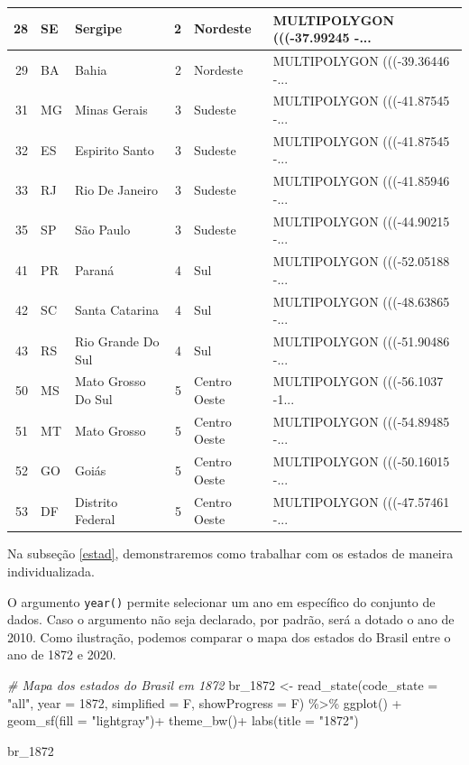 \documentclass[
  brazilian,
]{book}
\newenvironment{Shaded}{\begin{snugshade}}{\end{snugshade}}
\newcommand{\AttributeTok}[1]{\textcolor[rgb]{0.77,0.63,0.00}{#1}}
\newcommand{\CommentTok}[1]{\textcolor[rgb]{0.56,0.35,0.01}{\textit{#1}}}
\newcommand{\DecValTok}[1]{\textcolor[rgb]{0.00,0.00,0.81}{#1}}
\newcommand{\FunctionTok}[1]{\textcolor[rgb]{0.00,0.00,0.00}{#1}}
\newcommand{\NormalTok}[1]{#1}
\newcommand{\OtherTok}[1]{\textcolor[rgb]{0.56,0.35,0.01}{#1}}
\newcommand{\SpecialCharTok}[1]{\textcolor[rgb]{0.00,0.00,0.00}{#1}}
\newcommand{\StringTok}[1]{\textcolor[rgb]{0.31,0.60,0.02}{#1}}
\begin{document}
\begin{table}
\begin{tabular}[t]{r|l|l|r|l|l}
\hline
28 & SE & Sergipe & 2 & Nordeste & MULTIPOLYGON (((-37.99245 -...\\
\hline
29 & BA & Bahia & 2 & Nordeste & MULTIPOLYGON (((-39.36446 -...\\
\hline
31 & MG & Minas Gerais & 3 & Sudeste & MULTIPOLYGON (((-41.87545 -...\\
\hline
32 & ES & Espirito Santo & 3 & Sudeste & MULTIPOLYGON (((-41.87545 -...\\
\hline
33 & RJ & Rio De Janeiro & 3 & Sudeste & MULTIPOLYGON (((-41.85946 -...\\
\hline
35 & SP & São Paulo & 3 & Sudeste & MULTIPOLYGON (((-44.90215 -...\\
\hline
41 & PR & Paraná & 4 & Sul & MULTIPOLYGON (((-52.05188 -...\\
\hline
42 & SC & Santa Catarina & 4 & Sul & MULTIPOLYGON (((-48.63865 -...\\
\hline
43 & RS & Rio Grande Do Sul & 4 & Sul & MULTIPOLYGON (((-51.90486 -...\\
\hline
50 & MS & Mato Grosso Do Sul & 5 & Centro Oeste & MULTIPOLYGON (((-56.1037 -1...\\
\hline
51 & MT & Mato Grosso & 5 & Centro Oeste & MULTIPOLYGON (((-54.89485 -...\\
\hline
52 & GO & Goiás & 5 & Centro Oeste & MULTIPOLYGON (((-50.16015 -...\\
\hline
53 & DF & Distrito Federal & 5 & Centro Oeste & MULTIPOLYGON (((-47.57461 -...\\
\hline
\end{tabular}
\endgroup{}
\end{table}

Na subseção \ref{estad}, demonstraremos como trabalhar com os estados de maneira individualizada.

O argumento \texttt{year()} permite selecionar um ano em específico do conjunto de dados. Caso o argumento não seja declarado, por padrão, será a dotado o ano de 2010. Como ilustração, podemos comparar o mapa dos estados do Brasil entre o ano de 1872 e 2020.

\begin{Shaded}
\begin{Highlighting}[]
\CommentTok{\# Mapa dos estados do Brasil em 1872}
\NormalTok{br\_1872 }\OtherTok{\textless{}{-}} \FunctionTok{read\_state}\NormalTok{(}\AttributeTok{code\_state =} \StringTok{"all"}\NormalTok{,}
                      \AttributeTok{year =} \DecValTok{1872}\NormalTok{,}
                      \AttributeTok{simplified =}\NormalTok{ F,}
                      \AttributeTok{showProgress =}\NormalTok{ F) }\SpecialCharTok{\%\textgreater{}\%}
  \FunctionTok{ggplot}\NormalTok{() }\SpecialCharTok{+} 
  \FunctionTok{geom\_sf}\NormalTok{(}\AttributeTok{fill =} \StringTok{"lightgray"}\NormalTok{)}\SpecialCharTok{+}
  \FunctionTok{theme\_bw}\NormalTok{()}\SpecialCharTok{+}
  \FunctionTok{labs}\NormalTok{(}\AttributeTok{title =} \StringTok{"1872"}\NormalTok{)}

\NormalTok{br\_1872}
\end{Highlighting}
\end{Shaded}
\end{document}
